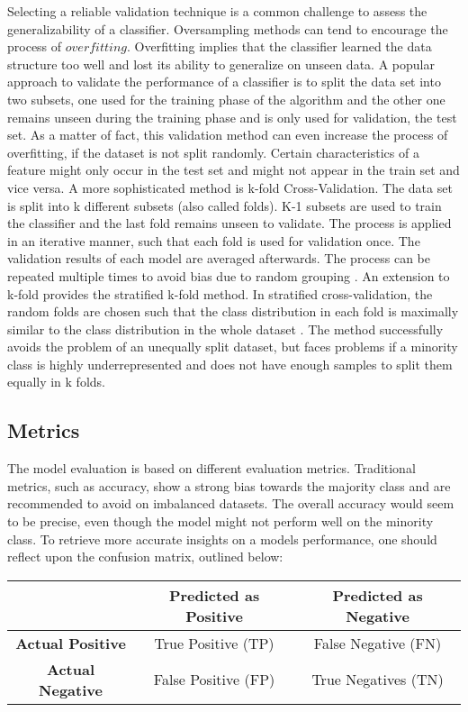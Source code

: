 \documentclass[parskip=full]{scrartcl}
\begin{document}
Selecting a reliable validation technique is a common challenge to assess the
generalizability of a classifier. Oversampling methods can tend to encourage the
process of $overfitting$. Overfitting implies that the classifier learned the
data structure too well and lost its ability to generalize on unseen data. A
popular approach to validate the performance of a classifier is to split the
data set into two subsets, one used for the training phase of the algorithm and
the other one remains unseen during the training phase and is only used for
validation, the test set. As a matter of fact, this validation method can even
increase the process of overfitting, if the dataset is not split randomly.
Certain characteristics of a feature might only occur in the test set and might
not appear in the train set and vice versa. A more sophisticated method is
k-fold Cross-Validation. The data set is split into k different subsets (also
called folds). K-1 subsets are used to train the classifier and the last fold
remains unseen to validate. The process is applied in an iterative manner, such
that each fold is used for validation once. The validation results of each model
are averaged afterwards. The process can be repeated multiple times to avoid
bias due to random grouping \cite{Japkowicz2013}. An extension to k-fold
provides the stratified k-fold method. In stratified cross-validation, the
random folds are chosen such that the class distribution in each fold is
maximally similar to the class distribution in the whole dataset
\cite{Vanwinckelen2015}. The method successfully avoids the problem of an
unequally split dataset, but faces problems if a minority class is highly
underrepresented and does not have enough samples to split them equally in k
folds.

\subsection{Metrics}

The model evaluation is based on different evaluation metrics. Traditional
metrics, such as accuracy, show a strong bias towards the majority class and are
recommended to avoid on imbalanced datasets. The overall accuracy would seem to
be precise, even though the model might not perform well on the minority class.
To retrieve more accurate insights on a models performance, one should reflect
upon the confusion matrix, outlined below: 

\begin{center}
\begin{tabular}{ c|c|c }
  & \textbf{Predicted as Positive} & \textbf{Predicted as Negative} \\  [1ex] 
  \hline
 \textbf{Actual Positive} & True Positive (TP) & False Negative (FN) \\  [1ex] 
 \textbf{Actual Negative} & False Positive (FP) & True Negatives (TN) \\ [1ex] 
\end{tabular}
\end{center}
\end{document}
